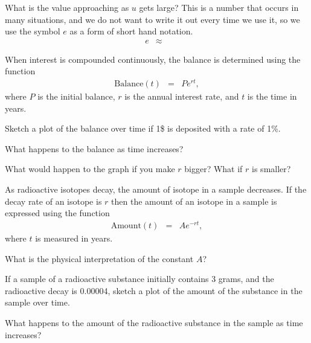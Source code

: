 \begin{problem}
\begin{subproblem}
  \item What is the value approaching as $u$ gets large? This is a
    number that occurs in many situations, and we do not want to write
    it out every time we use it, so we use the symbol $e$ as a form of
    short hand notation.
    \begin{eqnarray*}
      e & \approx & 
    \end{eqnarray*}
    
  \end{subproblem}

  \clearpage

\item When interest is compounded continuously, the balance is
  determined using the function
  \begin{eqnarray*}
    \mathrm{Balance}(t) & = & P e^{rt},
  \end{eqnarray*}
  where $P$ is the initial balance, $r$ is the annual interest rate,
  and $t$ is the time in years.

  \begin{subproblem}
  \item Sketch a plot of the balance over time if 1\$ is deposited with a
    rate of 1\%.

    \vfill

  \item What happens to the balance as time increases?

    \vfill

  \item What would happen to the graph if you make $r$ bigger? What if
    $r$ is smaller?

    \vfill
  \end{subproblem}
\clearpage

\item As radioactive isotopes decay, the amount of isotope in a sample
  decreases. If the decay rate of an isotope is $r$ then the amount of
  an isotope in a sample is expressed using the function
  \begin{eqnarray*}
    \mathrm{Amount}(t) & = & A e^{-rt},
  \end{eqnarray*}
  where $t$ is measured in years.

  \begin{subproblem}
  \item What is the physical interpretation of the constant $A$?
    \vspace{2em}

  \item If a sample of a radioactive substance initially contains 3
    grams, and the radioactive decay is 0.00004, sketch a plot of the
    amount of the substance in the sample over time.

    \vfill

  \item What happens to the amount of the radioactive substance in the
    sample as time increases?
    
    \vfill
  \end{subproblem}

\clearpage


\end{problem}

